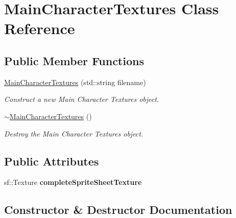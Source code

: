 \hypertarget{classMainCharacterTextures}{}\section{Main\+Character\+Textures Class Reference}
\label{classMainCharacterTextures}
\subsection*{Public Member Functions}
\begin{DoxyCompactItemize}
\item 
\mbox{\hyperlink{classMainCharacterTextures_a890bf578263a8c16d9abce1dc6ac9fe6}{Main\+Character\+Textures}} (std\+::string filename)
\begin{DoxyCompactList}\small\item\em Construct a new Main Character Textures object. \end{DoxyCompactList}\item 
\mbox{\hyperlink{classMainCharacterTextures_a08e0c3b7fcd4e6d79638f8fa14e1eadf}{$\sim$\+Main\+Character\+Textures}} ()
\begin{DoxyCompactList}\small\item\em Destroy the Main Character Textures object. \end{DoxyCompactList}\end{DoxyCompactItemize}
\subsection*{Public Attributes}
\begin{DoxyCompactItemize}
\item 
\mbox{\label{classMainCharacterTextures_afd5f788e193481ca97fc7db278f1294a}} 
sf\+::\+Texture {\bfseries complete\+Sprite\+Sheet\+Texture}
\end{DoxyCompactItemize}


\subsection{Constructor \& Destructor Documentation}
\mbox{\label{classMainCharacterTextures_a890bf578263a8c16d9abce1dc6ac9fe6}} 
